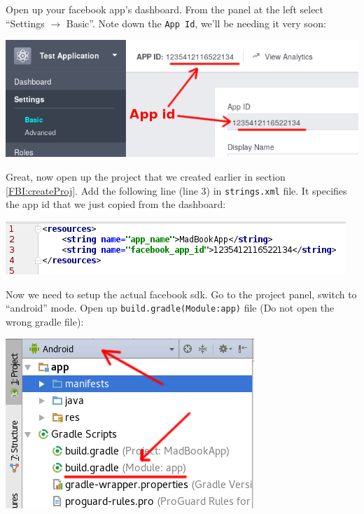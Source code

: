 Open up your facebook app's dashboard. From the panel at the left select ``Settings $\rightarrow$ Basic''. Note down the \texttt{App Id}, we'll be needing it very soon:

\begin{center}
	\includegraphics[scale=\SourceCodeScale]{chapters/ch12/images/9}
\end{center}

Great, now open up the project that we created earlier in section \ref{FBI:createProj}. Add the following line (line 3) in \texttt{strings.xml} file. It specifies the app id that we just copied from the dashboard:

\begin{center}
	\includegraphics[scale=\SourceCodeScale]{chapters/ch12/images/10}
\end{center}

Now we need to setup the actual facebook sdk. Go to the project panel, switch to ``android'' mode. Open up \texttt{build.gradle(Module:app)} file (Do not open the wrong gradle file):

\begin{center}
	\includegraphics[scale=\SourceCodeScale]{chapters/ch12/images/12}
\end{center}

